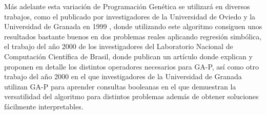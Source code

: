 Más adelante esta variación de Programación Genética se utilizará en diversos trabajos, como el publicado por investigadores de la Universidad de Oviedo y la Universidad de Granada en 1999 \cite{GAPredElectrica}, donde utilizando este algoritmo consiguen unos resultados bastante buenos en dos problemas reales aplicando regresión simbólica, el trabajo del año 2000 de los investigadores del Laboratorio Nacional de Computación Científica de Brasil, donde publican un artículo \cite{PGregresionSimbolica} donde explican y proponen en detalle los distintos operadores necesarios para GA-P, así como otro trabajo del año 2000 en el que investigadores de la Universidad de Granada utilizan GA-P para aprender consultas booleanas \cite{GAPFormulasBooleanas} en el que demuestran la versatilidad del algoritmo para distintos problemas además de obtener soluciones fácilmente interpretables.



\newpage
